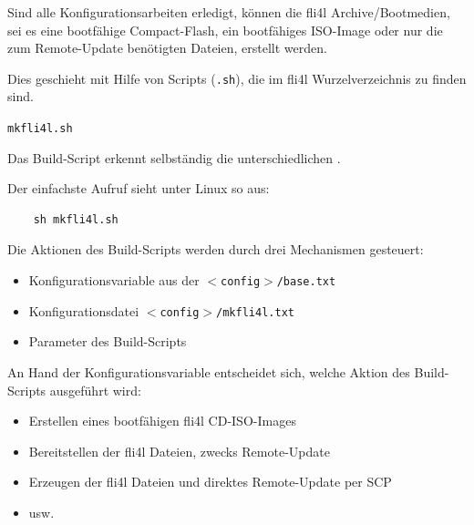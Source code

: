 

  Sind alle Konfigurationsarbeiten erledigt, können die fli4l Archive/Bootmedien, sei
  es eine bootfähige Compact-Flash, ein bootfähiges ISO-Image oder nur die zum Remote-Update
  benötigten Dateien, erstellt werden.


  Dies geschieht mit Hilfe von Scripts
  (\texttt{.sh}), die im fli4l Wurzelverzeichnis zu finden sind.

  \begin{description}
    \item \texttt{mkfli4l.sh}
  \end{description}

  Das Build-Script erkennt selbständig die unterschiedlichen .

  Der einfachste Aufruf sieht unter Linux so aus:
  \begin{verbatim}
    sh mkfli4l.sh
  \end{verbatim}

  Die Aktionen des Build-Scripts werden durch drei Mechanismen gesteuert:
  \begin{itemize}
    \item Konfigurationsvariable  aus der
          \texttt{$<$config$>$/base.txt}
    \item Konfigurationsdatei \texttt{$<$config$>$/mkfli4l.txt}
    \item Parameter des Build-Scripts
  \end{itemize}

  An Hand der Konfigurationsvariable 
  entscheidet sich, welche Aktion des Build-Scripts ausgeführt wird:
  \begin{itemize}
    \item Erstellen eines bootfähigen fli4l CD-ISO-Images
    \item Bereitstellen der fli4l Dateien, zwecks Remote-Update
    \item Erzeugen der fli4l Dateien und direktes Remote-Update per SCP
    \item usw.
  \end{itemize}

